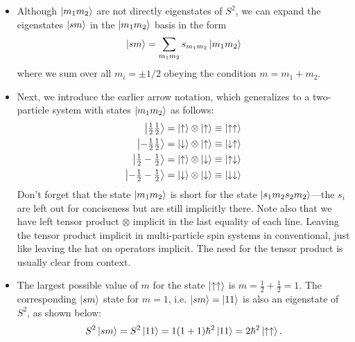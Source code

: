 \documentclass[11pt, a4paper]{article}
\newcommand{\ua}{\uparrow}  %
\newcommand{\da}{\downarrow}  %
\begin{document}
\begin{itemize}
    \item Although $ \ket{m_{1}m_{2}} $ are not directly eigenstates of $ S^{2} $, we can expand the eigenstates $ \ket{sm} $ in the $ \ket{m_{1}m_{2}} $ basis in the form
    \begin{equation*}
        \ket{sm} = \sum_{m_{1}m_{2}} s_{m_{1}m_{2}}\ket{m_{1}m_{2}}
    \end{equation*}
    where we sum over all $ m_{i} = \pm 1/2 $ obeying the condition $ m = m_{1} + m_{2} $. 
    
    \item Next, we introduce the earlier arrow notation, which generalizes to a two-particle system with states $ \ket{m_{1}m_{2}}  $ as follows:
    \begin{align*}
        \ket{\tfrac{1}{2}\tfrac{1}{2}} &= \ket{\ua} \otimes \ket{\ua} \equiv \ket{\ua\ua}\\
        \ket{-\tfrac{1}{2}\tfrac{1}{2}} &= \ket{\da} \otimes \ket{\ua} \equiv \ket{\da\ua}\\
        \ket{\tfrac{1}{2}-\tfrac{1}{2}} &= \ket{\ua} \otimes \ket{\da} \equiv \ket{\ua\da}\\
        \ket{-\tfrac{1}{2}-\tfrac{1}{2}} &= \ket{\da} \otimes \ket{\da} \equiv \ket{\da\da}
    \end{align*}
    Don't forget that the state $ \ket{m_{1}m_{2}} $ is short for the state $ \ket{s_{1}m_{2}s_{2}m_{2}} $---the $ s_{i} $ are left out for conciseness but are still implicitly there. Note also that we have left tensor product $ \otimes $ implicit in the last equality of each line. Leaving the tensor product implicit in multi-particle spin systems in conventional, just like leaving the hat on operators implicit. The need for the tensor product is usually clear from context.

    \item The largest possible value of $ m $ for the state $ \ket{\ua \ua} $ is $ m = \tfrac{1}{2} + \tfrac{1}{2} = 1 $. The corresponding $ \ket{sm} $ state for $ m = 1 $, i.e. $ \ket{sm} = \ket{11} $ is also an eigenstate of $ S^{2} $, as shown below:
    \begin{equation*}
        S^{2}\ket{sm} = S^{2}\ket{11} = 1(1 + 1)\hbar^{2}\ket{11} = 2\hbar^{2}\ket{\ua\ua}.
    \end{equation*}
    

\end{itemize}
\end{document}
